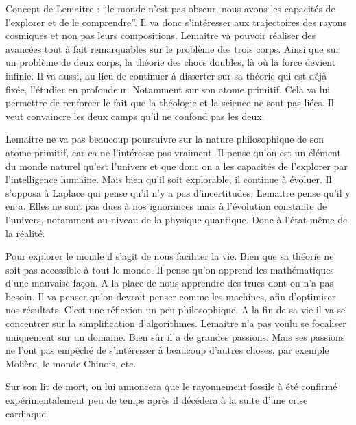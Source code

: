 \documentclass[11pt,a4paper]{article} %
\begin{document}
Concept de Lemaitre : ``le monde n'est pas obscur, nous avons les capacités de l'explorer et de le comprendre''.
 Il va donc s'intéresser aux trajectoires des rayons cosmiques et non pas leurs compositions.
Lemaitre va pouvoir réaliser des avancées tout à fait remarquables sur le problème des trois corps.
Ainsi que sur un problème de deux corps, la théorie des chocs doubles, là où la force devient infinie.
Il va aussi, au lieu de continuer à disserter sur sa théorie qui est déjà fixée, l'étudier en profondeur.
Notamment sur son atome primitif.
Cela va lui permettre de renforcer le fait que la théologie et la science ne sont pas liées.
Il veut convaincre les deux camps qu'il ne confond pas les deux.

Lemaitre ne va pas beaucoup poursuivre sur la nature philosophique de son atome primitif, car ca ne l'intéresse pas vraiment.
Il pense qu'on est un élément du monde naturel qu'est l'univers et que donc on a les capacités de l'explorer par l'intelligence humaine.
Mais bien qu'il soit explorable, il continue à évoluer.
Il s'opposa à Laplace qui pense qu'il n'y a pas d'incertitudes, Lemaitre pense qu'il y en a.
Elles ne sont pas dues à nos ignorances mais à l'évolution constante de l'univers, notamment au niveau de la physique quantique.
Donc à l'état même de la réalité.

Pour explorer le monde il s'agit de nous faciliter la vie.
Bien que sa théorie ne soit pas accessible à tout le monde.
Il pense qu'on apprend les mathématiques d'une mauvaise façon.
A la place de nous apprendre des trucs dont on n'a pas besoin.
Il va penser qu'on devrait penser comme les machines, afin d'optimiser nos résultats.
C'est une réflexion un peu philosophique.
A la fin de sa vie il va se concentrer sur la simplification d'algorithmes.
Lemaitre n'a pas voulu se focaliser uniquement sur un domaine.
Bien sûr il a de grandes passions.
Mais ses passions ne l'ont pas empêché de s'intéresser à beaucoup d'autres choses, par exemple Molière, le monde Chinois, etc.

Sur son lit de mort, on lui annoncera que le rayonnement fossile à été confirmé expérimentalement peu de temps après il décédera à la suite d'une crise cardiaque.
\end{document}
